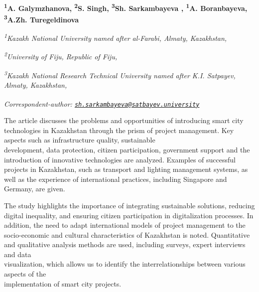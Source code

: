 
\begin{articleheader}

{\bfseries
\textsuperscript{1}A. Galymzhanova,
\textsuperscript{2}S. Singh,
\textsuperscript{3}Sh. Sarkambayeva\textsuperscript{\envelope } ,
\textsuperscript{1}A. Boranbayeva,
\textsuperscript{3}A.Zh. Turegeldinova}
\end{articleheader}

\begin{affiliation}
\emph{\textsuperscript{1}Kazakh National University named after al-Farabi, Almaty, Kazakhstan,}

\emph{\textsuperscript{2}University of Fiju, Republic of Fiju,}

\emph{\textsuperscript{3}Kazakh National Research Technical University named after K.I. Satpayev, Almaty, Kazakhstan,}

\raggedright \textsuperscript{\envelope }{\em Correspondent-author: \href{mailto:sh.sarkambayeva@satbayev.university}{\nolinkurl{sh.sarkambayeva@satbayev.university}}}
\end{affiliation}

The article discusses the problems and opportunities of introducing
smart city technologies in Kazakhstan through the prism of project
management. Key aspects such as infrastructure quality, sustainable
\\development, data protection, citizen participation, government support
and the introduction of innovative technologies are analyzed. Examples
of successful projects in Kazakhstan, such as transport and lighting
management systems, as well as the experience of international
practices, including Singapore and Germany, are given.

The study highlights the importance of integrating sustainable
solutions, reducing digital inequality, and ensuring citizen
participation in digitalization processes. In addition, the need to
adapt international models of project management to the socio-economic
and cultural characteristics of Kazakhstan is noted. Quantitative and
qualitative analysis methods are used, including surveys, expert
interviews and data \\visualization, which allows us to identify the
interrelationships between various aspects of the \\implementation of
smart city projects.

